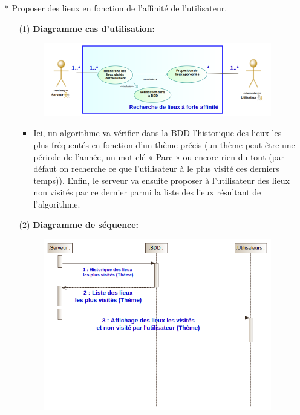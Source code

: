 \documentclass[12pt]{article}
\begin{document}
\newpage
\begin{itemize}
	\item[* ] Proposer des lieux en fonction de l’affinité de l’utilisateur.
	\begin{itemize}
		\item[(1)] \textbf{Diagramme cas d'utilisation:}
	
	\begin{figure}[!hbtp]
		\centering
		\includegraphics[scale=0.75]{image4.png}
	\end{figure}
\begin{itemize}
	\item Ici, un algorithme va vérifier dans la BDD l’historique des lieux les plus fréquentés en fonction d’un thème précis (un thème peut être une période de l’année, un mot clé « Parc » ou encore rien du tout (par défaut on recherche ce que l’utilisateur à le plus visité ces derniers temps)).
	Enfin, le serveur va ensuite proposer à l’utilisateur des lieux non visités par ce dernier parmi la liste des lieux résultant de l’algorithme.
	
\end{itemize}
\item[(2)] \textbf{Diagramme de séquence:}
	\begin{figure}[!hbtp]
	\centering
	\includegraphics[scale=0.75]{image5.png}
\end{figure}
\end{itemize}
\end{itemize}
\end{document}
